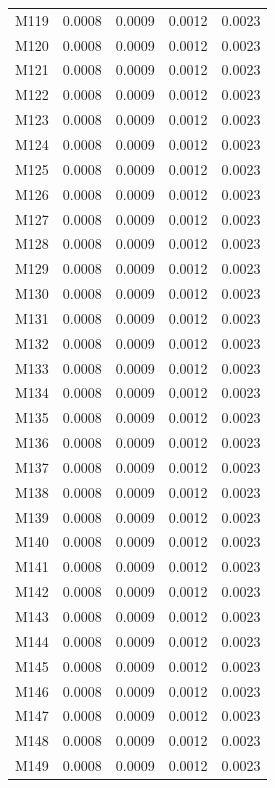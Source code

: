 \begin{longtable}{lrrrr}
M119 & 0.0008 & 0.0009 & 0.0012 & 0.0023 \\
M120 & 0.0008 & 0.0009 & 0.0012 & 0.0023 \\
M121 & 0.0008 & 0.0009 & 0.0012 & 0.0023 \\
M122 & 0.0008 & 0.0009 & 0.0012 & 0.0023 \\
M123 & 0.0008 & 0.0009 & 0.0012 & 0.0023 \\
M124 & 0.0008 & 0.0009 & 0.0012 & 0.0023 \\
M125 & 0.0008 & 0.0009 & 0.0012 & 0.0023 \\
M126 & 0.0008 & 0.0009 & 0.0012 & 0.0023 \\
M127 & 0.0008 & 0.0009 & 0.0012 & 0.0023 \\
M128 & 0.0008 & 0.0009 & 0.0012 & 0.0023 \\
M129 & 0.0008 & 0.0009 & 0.0012 & 0.0023 \\
M130 & 0.0008 & 0.0009 & 0.0012 & 0.0023 \\
M131 & 0.0008 & 0.0009 & 0.0012 & 0.0023 \\
M132 & 0.0008 & 0.0009 & 0.0012 & 0.0023 \\
M133 & 0.0008 & 0.0009 & 0.0012 & 0.0023 \\
M134 & 0.0008 & 0.0009 & 0.0012 & 0.0023 \\
M135 & 0.0008 & 0.0009 & 0.0012 & 0.0023 \\
M136 & 0.0008 & 0.0009 & 0.0012 & 0.0023 \\
M137 & 0.0008 & 0.0009 & 0.0012 & 0.0023 \\
M138 & 0.0008 & 0.0009 & 0.0012 & 0.0023 \\
M139 & 0.0008 & 0.0009 & 0.0012 & 0.0023 \\
M140 & 0.0008 & 0.0009 & 0.0012 & 0.0023 \\
M141 & 0.0008 & 0.0009 & 0.0012 & 0.0023 \\
M142 & 0.0008 & 0.0009 & 0.0012 & 0.0023 \\
M143 & 0.0008 & 0.0009 & 0.0012 & 0.0023 \\
M144 & 0.0008 & 0.0009 & 0.0012 & 0.0023 \\
M145 & 0.0008 & 0.0009 & 0.0012 & 0.0023 \\
M146 & 0.0008 & 0.0009 & 0.0012 & 0.0023 \\
M147 & 0.0008 & 0.0009 & 0.0012 & 0.0023 \\
M148 & 0.0008 & 0.0009 & 0.0012 & 0.0023 \\
M149 & 0.0008 & 0.0009 & 0.0012 & 0.0023 \\

\end{longtable}
